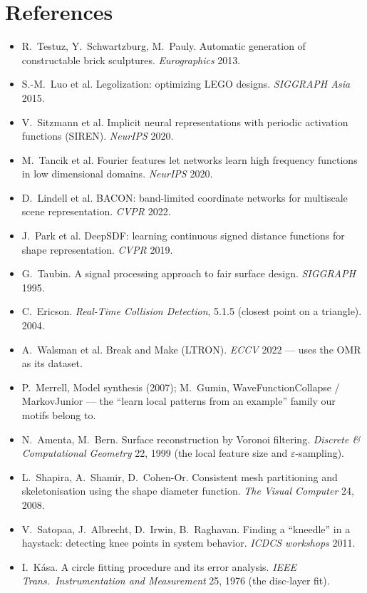 \documentclass[10pt,a4paper]{article}
\begin{document}
\section*{References}
\small
\begin{itemize}
\item R.~Testuz, Y.~Schwartzburg, M.~Pauly. Automatic generation of constructable brick sculptures. \emph{Eurographics} 2013.
\item S.-M.~Luo et al. Legolization: optimizing LEGO designs. \emph{SIGGRAPH Asia} 2015.
\item V.~Sitzmann et al. Implicit neural representations with periodic activation functions (SIREN). \emph{NeurIPS} 2020.
\item M.~Tancik et al. Fourier features let networks learn high frequency functions in low dimensional domains. \emph{NeurIPS} 2020.
\item D.~Lindell et al. BACON: band-limited coordinate networks for multiscale scene representation. \emph{CVPR} 2022.
\item J.~Park et al. DeepSDF: learning continuous signed distance functions for shape representation. \emph{CVPR} 2019.
\item G.~Taubin. A signal processing approach to fair surface design. \emph{SIGGRAPH} 1995.
\item C.~Ericson. \emph{Real-Time Collision Detection}, 5.1.5 (closest point on a triangle). 2004.
\item A.~Walsman et al. Break and Make (LTRON). \emph{ECCV} 2022 --- uses the OMR as its dataset.
\item P.~Merrell, Model synthesis (2007); M.~Gumin, WaveFunctionCollapse / MarkovJunior --- the ``learn local patterns from an example'' family our motifs belong to.
\item N.~Amenta, M.~Bern. Surface reconstruction by Voronoi filtering. \emph{Discrete \& Computational Geometry} 22, 1999 (the local feature size and $\varepsilon$-sampling).
\item L.~Shapira, A.~Shamir, D.~Cohen-Or. Consistent mesh partitioning and skeletonisation using the shape diameter function. \emph{The Visual Computer} 24, 2008.
\item V.~Satopaa, J.~Albrecht, D.~Irwin, B.~Raghavan. Finding a ``kneedle'' in a haystack: detecting knee points in system behavior. \emph{ICDCS workshops} 2011.
\item I.~K\'{a}sa. A circle fitting procedure and its error analysis. \emph{IEEE Trans.\ Instrumentation and Measurement} 25, 1976 (the disc-layer fit).
\end{itemize}
\end{document}

